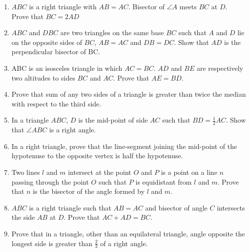 \begin{enumerate}[label=\thesection.\arabic*,ref=\thesection.\theenumi]
\item $ABC$ is a right triangle with $AB = AC$. Bisector of $\angle A$ meets $BC$ at $D$. Prove that $BC = 2 AD$
\item $ABC$ and $DBC$ are two triangles on the same base $BC$ such that $A$ and $D$ lie on the opposite sides of $BC$, $AB = AC$ and $DB = DC$. Show that $AD$ is the perpendicular bisector of BC.
\item ABC is an isosceles triangle in which $AC = BC$. $AD$ and $BE$ are respectively two altitudes to sides $BC$ and $AC$. Prove that $AE = BD$.
\item Prove that sum of any two sides of a triangle is greater than twice the median with respect to the third side.
\item In a triangle $ABC$, $D$ is the mid-point of side $AC$ such that $ BD = \frac{1}{2} AC $. Show that $\angle ABC$ is a right angle.
\item In a right triangle, prove that the line-segment joining the mid-point of the hypotenuse to the opposite vertex is half the hypotenuse.
\item Two lines $l$ and $m$ intersect at the point $O$ and $P$ is a point on a line $n$ passing through the point $O$ such that $P$ is equidistant from $l$ and $m$. Prove that $n$ is the bisector of the angle formed by $l$ and $m$.
\item $ABC$ is a right triangle such that $AB = AC$ and bisector of angle $C$ intersects the side $AB$ at $D$. Prove that $AC + AD = BC$.
\item Prove that in a triangle, other than an equilateral triangle, angle opposite the longest side is greater than $\frac{2}{3}$ of a right angle.
\end{enumerate}

